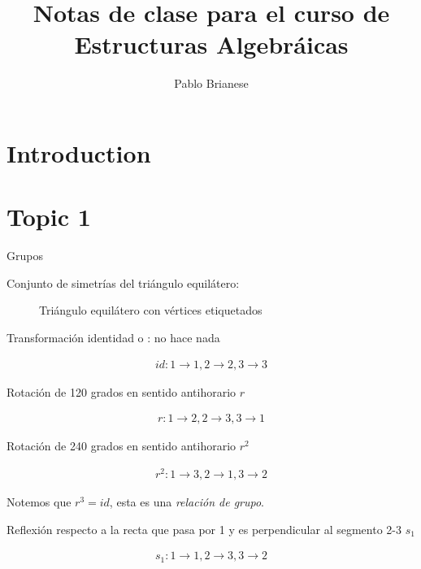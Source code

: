 \documentclass{article}
\title{Notas de clase para el curso de Estructuras Algebráicas}
\author{Pablo Brianese}
\begin{document}
\maketitle

\tableofcontents

\section{Introduction}

\section{Topic 1}

Grupos

Conjunto de simetrías del triángulo equilátero:

\begin{figure}[h]
  \centering
  \caption{Triángulo equilátero con vértices etiquetados}
\end{figure}

Transformación identidad  o : no hace nada

\begin{align*}
  id: 1 \rightarrow 1, 2 \rightarrow 2, 3 \rightarrow 3
\end{align*}

Rotación de 120 grados en sentido antihorario $r$

\begin{align*}
  r: 1 \rightarrow 2, 2 \rightarrow 3, 3 \rightarrow 1
\end{align*}

Rotación de 240 grados en sentido antihorario $r^2$

\begin{align*}
  r^2: 1 \rightarrow 3, 2 \rightarrow 1, 3 \rightarrow 2
\end{align*}

Notemos que $r^3 = id$, esta es una \textit{relación de grupo}.

Reflexión respecto a la recta que pasa por 1 y es perpendicular al segmento 2-3 $s_1$

\begin{align*}
  s_1: 1 \rightarrow 1, 2 \rightarrow 3, 3 \rightarrow 2
\end{align*}
\end{document}
